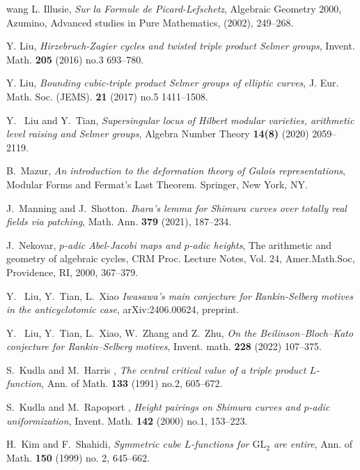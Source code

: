 \documentclass[10pt]{amsart}
\numberwithin{equation}{section}
\theoremstyle{plain}
\numberwithin{equation}{section}
\theoremstyle{definition}
\theoremstyle{remark}
\def\GL{\mathrm{GL}}
\begin{document}
\begin{thebibliography}{wang}
L. Illusie, {\em Sur la Formule de Picard-Lefschetz},  Algebraic Geometry 2000, Azumino, Advanced studies in Pure Mathematics, (2002), 249--268. 


Y. Liu, {\em Hirzebruch-{Z}agier cycles and twisted triple product {S}elmer groups}, 
Invent. Math. {\bf 205} (2016) no.3  693--780.

Y. Liu, {\em Bounding cubic-triple product {S}elmer groups of elliptic curves}, 
J. Eur. Math. Soc. (JEMS). {\bf 21} (2017) no.5  1411--1508.

Y.~ Liu and Y.~Tian, {\em Supersingular locus of Hilbert modular varieties, arithmetic level raising and Selmer groups}, 
Algebra Number Theory  {\bf 14(8)} (2020) 2059--2119.

B.~Mazur,
{\em An introduction to the deformation theory of Galois representations}, Modular Forms and Fermat's Last Theorem. Springer, New York, NY. 

J.~Manning and J.~Shotton.
{\em Ihara's lemma for Shimura curves over totally real fields via patching}, Math. Ann. {\bf 379} (2021), 187--234.

J.~Nekovar, {\em $p$-adic Abel-Jacobi maps and $p$-adic heights}, The arithmetic and geometry of algebraic cycles, CRM Proc. Lecture Notes,  {V}ol. 24, Amer.Math.Soc, Providence, RI, 2000, 367--379. 

Y.~ Liu, Y.~Tian, L.~Xiao {\em Iwasawa's main conjecture for Rankin-Selberg motives in the anticyclotomic case}, 
arXiv:2406.00624, preprint.

Y.~ Liu, Y.~Tian, L.~Xiao, W.~Zhang and Z.~Zhu, {\em On the Beilinson--Bloch--Kato conjecture for Rankin--Selberg motives}, 
Invent. math. {\bf 228} (2022) 107--375.

S.~Kudla and M.~Harris , {\em The central critical value of a triple product {$L$}-function}, 
Ann. of Math. {\bf 133} (1991) no.2,  605--672.

S.~Kudla and M.~Rapoport , {\em Height pairings on {S}himura curves and {$p$}-adic uniformization}, 
Invent. Math. {\bf 142} (2000) no.1, 153--223.

H.~Kim and F.~Shahidi, {\em Symmetric cube $L$-functions for $\GL_{2}$ are entire}, 
Ann. of Math. {\bf 150} (1999) no. 2, 645--662.


\end{thebibliography}
\end{document}
